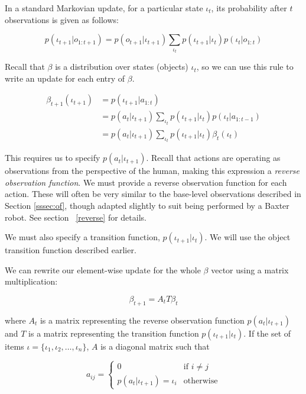 \documentclass[conference]{IEEEtran}
\begin{document}
In a standard Markovian update, for a particular state $\iota_t$, its probability after $t$ observations is given as follows: 

\begin{equation*}
	p(\iota_{t+1} | o_{1:t+1}) = p(o_{t+1} | \iota_{t+1}) \sum_{\iota_{t}} p(\iota_{t+1} | \iota_{t}) p (\iota_{t} | o_{1:t})
\end{equation*}

Recall that $\beta$ is a distribution over states (objects) $\iota_t$, so we can use this rule to write an update for each entry of $\beta$. 

\begin{align*}
	\beta_{t+1}(\iota_{t+1})&= p(\iota_{t+1} | a_{1:t})  \\
	&= p(a_{t} | \iota_{t+1}) \sum_{\iota_{t}} p(\iota_{t+1} | \iota_{t}) p (\iota_{t} | a_{1:t-1}) \\ 
	&= p(a_{t} | \iota_{t+1}) \sum_{\iota_{t}} p(\iota_{t+1} | \iota_{t}) \beta_{t}(\iota_{t}) 
\end{align*}

This requires us to specify $p(a_{t} | \iota_{t+1})$. Recall that actions are operating as observations from the perspective of the human, making this expression a \emph{reverse observation function}. We must provide a reverse observation function for each action. These will often be very similar to the base-level observations described in Section \ref{sssec:of}, though adapted slightly to suit being performed by a Baxter robot. See section ~\ref{reverse} for details. 

We must also specify a transition function, $p(\iota_{t+1} | \iota_t)$. We will use the object transition function described earlier. 

We can rewrite our element-wise update for the whole $\beta$ vector using a matrix multiplication: 


$$\beta_{t+1} = A_{t}T \beta_{t}$$


where $A_{t}$ is a matrix representing the reverse observation function $p(a_{t} | \iota_{t+1})$ and $T$ is a matrix representing the transition function $p(\iota_{t+1}|\iota_{t})$.  If the set of items $\mathcal{\iota} = \{ \iota_1, \iota_2, \ldots, \iota_n\}$, $A$ is a diagonal matrix such that

\begin{equation*}
	a_{ij} = \begin{cases}
		0 & \text{if } i \ne j \\
		p(a_t | \iota_{t+1}) = \iota_i & \text{otherwise}
	\end{cases}
\end{equation*}
\end{document}
